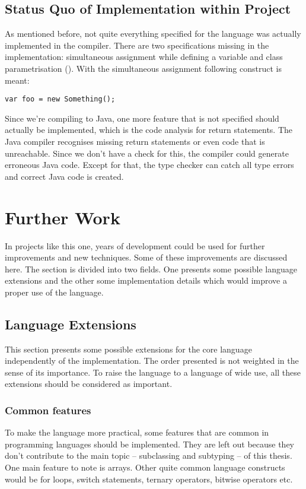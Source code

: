 \subsection{Status Quo of Implementation within Project}
\label{sec:statusQuo}

As mentioned before, not quite everything specified for the language
was actually implemented in the compiler. There are two specifications missing
in the implementation: simultaneous assignment while defining a variable
and class parametrisation (). With the simultaneous 
assignment following construct is meant:

\begin{lstlisting}[float=ht,language=ooplss,caption=Assignment on defining a variable,label=lst:vardefAssign]
var foo = new Something();
\end{lstlisting}

Since we're compiling to Java, one more feature that
is not specified should actually be implemented, which is the code analysis
for return statements. The Java compiler recognises missing return statements
or even code that is unreachable. Since we don't have a check for this, the 
compiler could generate erroneous Java code. Except for that, the type checker
can catch all type errors and correct Java code is created.

\section{Further Work}
\label{sec:futureWork}
In projects like this one, years of development could be used for
further improvements and new techniques. Some of these improvements are
discussed here. The section is divided into two fields. One presents some
possible language extensions and the other some implementation details
which would improve a proper use of the language.

\subsection{Language Extensions}
This section presents some possible extensions for the core language
independently of the implementation. The order presented is not weighted
in the sense of its importance. To raise the language to a language
of wide use, all these extensions should be considered as important.

\subsubsection{Common features}
To make the language more practical, some features that are common
in programming languages should be implemented. They are left out
because they don't contribute to the main topic -- subclassing and subtyping --
of this thesis.
One main feature to note is arrays. Other quite common language constructs
would be for loops, switch statements, ternary operators, bitwise operators
etc. 

